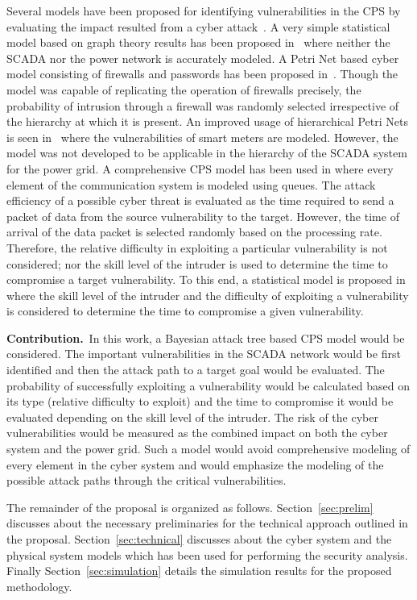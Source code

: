 Several models have been proposed for identifying vulnerabilities in the CPS by evaluating the impact resulted from a cyber attack~\cite{stanley_2018,maninmiddle,petrinet1,petrinet2,Sridhar2012,alex1,alex2,alex3}. A very simple statistical model based on graph theory results has been proposed in~\cite{stanley_2018} where neither the SCADA nor the power network is accurately modeled. A Petri Net based cyber model consisting of firewalls and passwords has been proposed in~\cite{petrinet1}. Though the model was capable of replicating the operation of firewalls precisely, the probability of intrusion through a firewall was randomly selected irrespective of the hierarchy at which it is present. An improved usage of hierarchical Petri Nets is seen in~\cite{petrinet2} where the vulnerabilities of smart meters are modeled. However, the model was not developed to be applicable in the hierarchy of the SCADA system for the power grid. A comprehensive CPS model has been used in \cite{alex1,alex2,alex3} where every element of the communication system is modeled using queues. The attack efficiency of a possible cyber threat is evaluated as the time required to send a packet of data from the source vulnerability to the target. However, the time of arrival of the data packet is selected randomly based on the processing rate. Therefore, the relative difficulty in exploiting a particular vulnerability is not considered; nor the skill level of the intruder is used to determine the time to compromise a target vulnerability. To this end, a statistical model is proposed in~\cite{mcqueen} where the skill level of the intruder and the difficulty of exploiting a vulnerability is considered to determine the time to compromise a given vulnerability.

\textbf{Contribution.}\ In this work, a Bayesian attack tree based CPS model would be considered. The important vulnerabilities in the SCADA network would be first identified and then the attack path to a target goal would be evaluated. The probability of successfully exploiting a vulnerability would be calculated based on its type (relative difficulty to exploit) and the time to compromise it would be evaluated depending on the skill level of the intruder. The risk of the cyber vulnerabilities would be measured as the combined impact on both the cyber system and the power grid. Such a model would avoid comprehensive modeling of every element in the cyber system and would emphasize the modeling of the possible attack paths through the critical vulnerabilities.

The remainder of the proposal is organized as follows. Section~\ref{sec:prelim} discusses about the necessary preliminaries for the technical approach outlined in the proposal. Section~\ref{sec:technical} discusses about the cyber system and the physical system models which has been used for performing the security analysis. Finally Section~\ref{sec:simulation} details the simulation results for the proposed methodology.